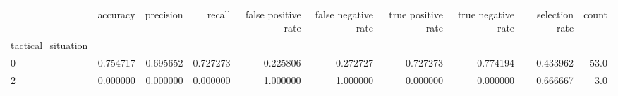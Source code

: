 \begin{tabular}{lrrrrrrrrr}
\toprule
{} &  accuracy &  precision &    recall &  false positive rate &  false negative rate &  true positive rate &  true negative rate &  selection rate &  count \\
tactical\_situation &           &            &           &                      &                      &                     &                     &                 &        \\
\midrule
0                  &  0.754717 &   0.695652 &  0.727273 &             0.225806 &             0.272727 &            0.727273 &            0.774194 &        0.433962 &   53.0 \\
2                  &  0.000000 &   0.000000 &  0.000000 &             1.000000 &             1.000000 &            0.000000 &            0.000000 &        0.666667 &    3.0 \\
\bottomrule
\end{tabular}
